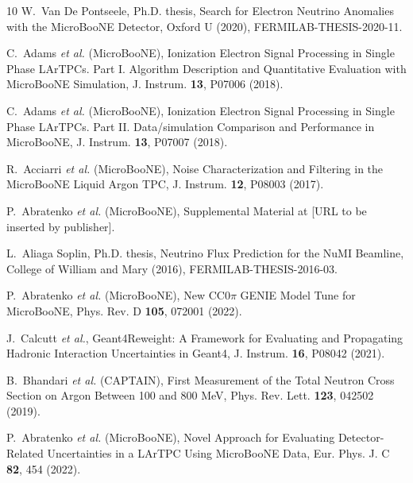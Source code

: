 \documentclass[aps,prl,twocolumn,superscriptaddress]{revtex4}
\begin{document}
\begin{thebibliography}{10}
W.~Van De Pontseele, Ph.D. thesis,
Search for Electron Neutrino Anomalies with the MicroBooNE Detector,
Oxford U (2020),
FERMILAB-THESIS-2020-11.

C.~Adams \textit{et al.} (MicroBooNE),
Ionization Electron Signal Processing in Single Phase LArTPCs. Part I. Algorithm Description and Quantitative Evaluation with MicroBooNE Simulation,
J. Instrum. \textbf{13}, P07006 (2018).


C.~Adams \textit{et al.} (MicroBooNE),
Ionization Electron Signal Processing in Single Phase LArTPCs. Part II. Data/simulation Comparison and Performance in MicroBooNE,
J. Instrum. \textbf{13}, P07007 (2018).

R.~Acciarri \textit{et al.} (MicroBooNE),
Noise Characterization and Filtering in the MicroBooNE Liquid Argon TPC,
J. Instrum. \textbf{12}, P08003 (2017).

P.~Abratenko \textit{et al.} (MicroBooNE),
Supplemental Material at [URL to be inserted by publisher]. 

L.~Aliaga Soplin, Ph.D. thesis,
Neutrino Flux Prediction for the NuMI Beamline,
College of William and Mary (2016),
FERMILAB-THESIS-2016-03.

P.~Abratenko \textit{et al.} (MicroBooNE),
New CC0$\pi$ GENIE Model Tune for MicroBooNE,
Phys. Rev. D \textbf{105}, 072001 (2022).

J.~Calcutt \textit{et al.},
Geant4Reweight: A Framework for Evaluating and Propagating Hadronic Interaction Uncertainties in Geant4,
J. Instrum. \textbf{16}, P08042 (2021).

B.~Bhandari \textit{et al.} (CAPTAIN),
First Measurement of the Total Neutron Cross Section on Argon Between 100 and 800 MeV,
Phys. Rev. Lett. \textbf{123}, 042502 (2019).

P.~Abratenko \textit{et al.} (MicroBooNE),
Novel Approach for Evaluating Detector-Related Uncertainties in a LArTPC Using MicroBooNE Data,
Eur. Phys. J. C \textbf{82}, 454 (2022).


\end{thebibliography}
\end{document}

